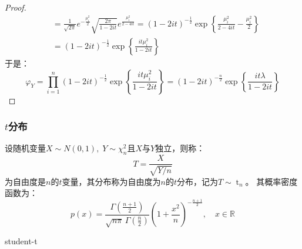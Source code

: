 \begin{proof}
\begin{align*}
		&=\frac{1}{\sqrt{2\pi}}e^{-\frac{\mu_i^2}{2}}\sqrt{\frac{2\pi}{1-2it}}e^{\frac{\mu_i^2}{2-4it}}
		=(1-2it)^{-\frac{1}{2}}\exp\left\{\frac{\mu_i^2}{2-4it}-\frac{\mu_i^2}{2}\right\} \\
		&=(1-2it)^{-\frac{1}{2}}\exp\left\{\frac{it\mu_i^2}{1-2it}\right\}
	\end{align*}
	于是：
	\begin{equation*}
		\varphi_{Y}=\prod_{i=1}^n(1-2it)^{-\frac{1}{2}}\exp\left\{\frac{it\mu_i^2}{1-2it}\right\}=(1-2it)^{-\frac{n}{2}}\exp\left\{\frac{it\lambda}{1-2it}\right\}
	\end{equation*}\par
\end{proof}
\subsubsection{$t$分布}
\begin{definition}
	设随机变量$X\sim N(0,1),\;Y\sim\chi_n^2$且$X$与$Y$独立，则称：
	\begin{equation*}
		T=\frac{X}{\sqrt{Y/ n}}
	\end{equation*}
	为自由度是$n$的$t$变量，其分布称为自由度为$n$的$t$分布，记为$T\sim \operatorname{t}_n$。
	其概率密度函数为：
	\begin{equation*}
		p(x)=\frac{\Gamma\left(\frac{n+1}{2}\right)}{\sqrt{n\pi}\,\Gamma\left(\frac{n}{2}\right)}
		\left(1+\frac{x^2}{n}\right)^{-\frac{n+1}{2}},\quad x\in\mathbb{R}
	\end{equation*}
\end{definition}
\begin{densityplot}{student-t}
	\caption{$t$ 分布 $\operatorname{t}_5$ 的概率密度函数}
\end{densityplot}
